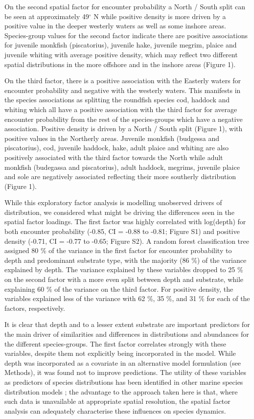 \documentclass{nature}
\begin{document}
\begin{linenumbers}
On the second spatial factor for encounter probability a North / South split
can be seen at approximately 49$^{\circ}$ N while positive density is more
driven by a positive value in the deeper westerly waters as well as some
inshore areas. Species-group values for the second factor indicate there are
positive associations for juvenile monkfish (piscatorius), juvenile hake,
juvenile megrim, plaice and juvenile whiting with average positive density,
which may reflect two different spatial distributions in the more offshore and
in the inshore areas (Figure 1).

On the third factor, there is a positive association with the Easterly waters
for encounter probability and negative with the westerly waters. This manifests
in the species associations as splitting the roundfish species cod, haddock and
whiting which all have a positive association with the third factor for average
encounter probability from the rest of the species-groups which have a negative
association. Positive density is driven by a North / South split (Figure 1),
with positive values in the Northerly areas. Juvenile monkfish (budgessa and
piscatorius), cod, juvenile haddock, hake, adult plaice and whiting are also
positively associated with the third factor towards the North while adult
monkfish (budegassa and piscatorius), adult haddock, megrims, juvenile plaice
and sole are negatively associated reflecting their more southerly distribution
(Figure 1).

While this exploratory factor analysis is modelling unobserved drivers of
distribution, we considered what might be driving the differences seen in the
spatial factor loadings. The first factor was highly correlated with log(depth)
for both encounter probability (-0.85, CI = -0.88 to -0.81; Figure S1) and
positive density (-0.71, CI = -0.77 to -0.65; Figure S2). A random forest
classification tree assigned 80 \% of the variance in the first factor for
encounter probability to depth and predominant substrate type, with the
majority (86 \%) of the variance explained by depth. The variance explained by
these variables dropped to 25 \% on the second factor with a more even split
between depth and substrate, while explaining 60 \% of the variance on the
third factor.  For positive density, the variables explained less of the
variance with 62 \%, 35 \%, and 31 \% for each of the factors, respectively.

It is clear that depth and to a lesser extent substrate are important
predictors for the main driver of similarities and differences in distributions
and abundances for the different species-groups. The first factor correlates
strongly with these variables, despite them not explicitly being incorporated
in the model. While depth was incorporated as a covariate in an alternative
model formulation (see Methods), it was found not to improve predictions. The
utility of these variables as predictors of species distributions has been
identified in other marine species distribution models \cite{Robinson2011}; the
advantage to the approach taken here is that, where such data is unavailable at
appropriate spatial resolution, the spatial factor analysis can adequately
characterise these influences on species dynamics.


\end{linenumbers}
\end{document}
